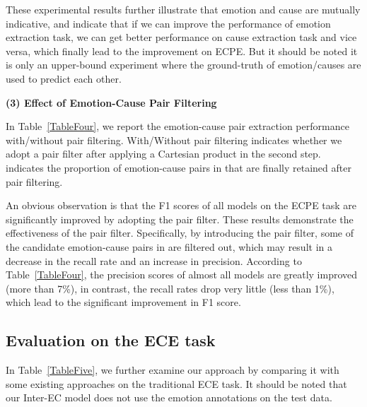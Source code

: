 \documentclass[11pt,a4paper]{article}
\begin{document}
These experimental results further illustrate that emotion and cause are mutually indicative, and indicate that if we can improve the performance of emotion extraction task, we can get better performance on cause extraction task and vice versa, which finally lead to the improvement on ECPE. But it should be noted it is only an upper-bound experiment where the ground-truth of emotion/causes are used to predict each other.

\vspace{2mm}

\noindent \textbf{(3) Effect of Emotion-Cause Pair Filtering}

In Table~\ref{TableFour}, we report the emotion-cause pair extraction performance with/without pair filtering. With/Without pair filtering indicates whether we adopt a pair filter after applying a Cartesian product in the second step.  indicates the proportion of emotion-cause pairs in  that are finally retained after pair filtering.

An obvious observation is that the F1 scores of all models on the ECPE task are significantly improved by adopting the pair filter. These results demonstrate the effectiveness of the pair filter. Specifically, by introducing the pair filter, some of the candidate emotion-cause pairs in  are filtered out, which may result in a decrease in the recall rate and an increase in precision. According to Table~\ref{TableFour}, the precision scores of almost all models are greatly improved (more than 7\%), in contrast, the recall rates drop very little (less than 1\%), which lead to the significant improvement in F1 score.

\subsection{Evaluation on the ECE task}
In Table~\ref{TableFive}, we further examine our approach by comparing it with some existing approaches on the traditional ECE task. It should be noted that our Inter-EC model does not use the emotion annotations on the test data.
\end{document}

